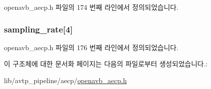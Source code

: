 openavb\+\_\+aecp.\+h 파일의 174 번째 라인에서 정의되었습니다.

\subsubsection[{\texorpdfstring{sampling\+\_\+rate}{sampling_rate}}]{ sampling\+\_\+rate\mbox{[}4\mbox{]}}\hypertarget{structopenavb__aecp__commandresponse__data__set__sampling__rate__t_a6b09041f69d1e15bd5278514758e680a}{}\label{structopenavb__aecp__commandresponse__data__set__sampling__rate__t_a6b09041f69d1e15bd5278514758e680a}


openavb\+\_\+aecp.\+h 파일의 176 번째 라인에서 정의되었습니다.



이 구조체에 대한 문서화 페이지는 다음의 파일로부터 생성되었습니다.\+:\begin{DoxyCompactItemize}
\item 
lib/avtp\+\_\+pipeline/aecp/\hyperlink{openavb__aecp_8h}{openavb\+\_\+aecp.\+h}\end{DoxyCompactItemize}
